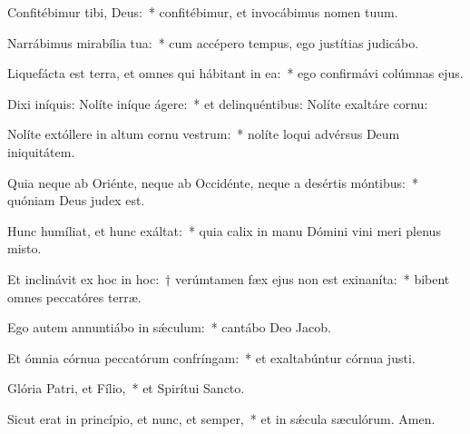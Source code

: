\item Confitébimur tibi, Deus:~* confitébimur, et invocábimus nomen tuum.

\item Narrábimus mirabília tua:~* cum accépero tempus, ego justítias judicábo.

\item Liquefácta est terra, et omnes qui hábitant in ea:~* ego confirmávi colúmnas ejus.

\item Dixi iníquis: Nolíte iníque ágere:~* et delinquéntibus: Nolíte exaltáre cornu:

\item Nolíte extóllere in altum cornu vestrum:~* nolíte loqui advérsus Deum iniquitátem.

\item Quia neque ab Oriénte, neque ab Occidénte, neque a desértis móntibus:~* quóniam Deus judex est.

\item Hunc humíliat, et hunc exáltat:~* quia calix in manu Dómini vini meri plenus misto.

\item Et inclinávit ex hoc in hoc:~† verúmtamen fæx ejus non est exinaníta:~* bibent omnes peccatóres terræ.

\item Ego autem annuntiábo in sǽculum:~* cantábo Deo Jacob.

\item Et ómnia córnua peccatórum confríngam:~* et exaltabúntur córnua justi.

\item Glória Patri, et Fílio,~* et Spirítui Sancto.

\item Sicut erat in princípio, et nunc, et semper,~* et in sǽcula sæculórum. Amen.

